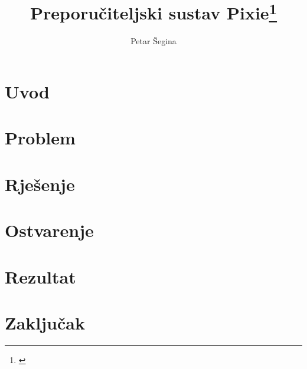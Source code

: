 \documentclass[times, utf8, seminar]{fer}
\begin{document}
\title{Preporučiteljski sustav Pixie\footnote{\cite{DBLP:journals/corr/abs-1711-07601}}}

\author{Petar Šegina}


\maketitle

\tableofcontents

\chapter{Uvod}

\chapter{Problem}

\chapter{Rješenje}

\chapter{Ostvarenje}

\chapter{Rezultat}

\chapter{Zaključak}



\end{document}
